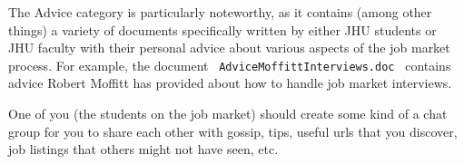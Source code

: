 \documentclass{\classes/econtex}
\begin{document}
\normalsize

The Advice category is particularly noteworthy, as it contains (among
other things) a variety of documents specifically written by either
JHU students or JHU faculty with their personal advice about various
aspects of the job market process.  For example, the document
~\texttt{AdviceMoffittInterviews.doc}~ contains advice Robert Moffitt
has provided about how to handle job market interviews.

One of you (the students on the job market) should create some kind of a chat group for you to share each other with gossip, tips, useful urls that you discover, job listings that others might not have seen, etc.
\end{document}
